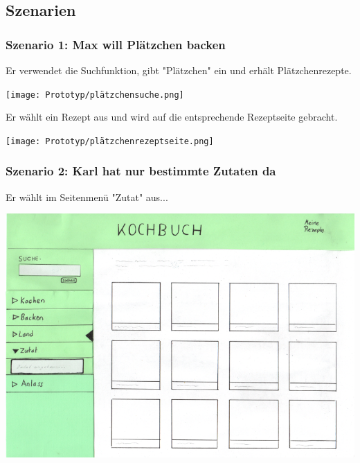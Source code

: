 \documentclass[parskip,10pt,abstracton]{scrartcl}
\begin{document}
\pagebreak
\subsection*{Szenarien}

\subsubsection*{Szenario 1: Max will Plätzchen backen}

Er verwendet die Suchfunktion, gibt "Plätzchen" ein und erhält Plätzchenrezepte.
\begin{center}
\texttt{[image: Prototyp/plätzchensuche.png]}
\end{center}

Er wählt ein Rezept aus und wird auf die entsprechende Rezeptseite gebracht.
\begin{center}
\texttt{[image: Prototyp/plätzchenrezeptseite.png]}
\end{center}


\subsubsection*{Szenario 2: Karl hat nur bestimmte Zutaten da}

Er wählt im Seitenmenü "Zutat" aus...
\begin{center}
\includegraphics[scale=0.4]{Prototyp/menu_zutat.png}
\end{center}
\end{document}
